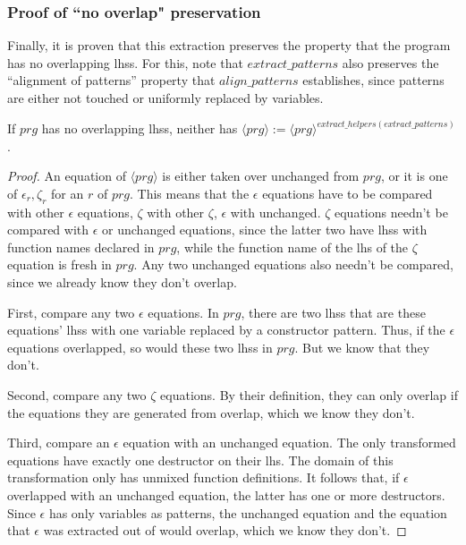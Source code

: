 \subsubsection{Proof of ``no overlap" preservation}

Finally, it is proven that this extraction preserves the property that the program has no overlapping lhss. For this, note that $extract\_patterns$ also preserves the ``alignment of patterns'' property that $align\_patterns$ establishes, since patterns are either not touched or uniformly replaced by variables.

\begin{lemma}

If $prg$ has no overlapping lhss, neither has $\langle prg \rangle := \langle prg \rangle^{extract\_helpers(extract\_patterns)}$.

\begin{proof}

An equation of $\langle prg \rangle$ is either taken over unchanged from $prg$, or it is one of $\epsilon_r, \zeta_r$ for an $r$ of $prg$. This means that the $\epsilon$ equations have to be compared with other $\epsilon$ equations, $\zeta$ with other $\zeta$, $\epsilon$ with unchanged. $\zeta$ equations needn't be compared with $\epsilon$ or unchanged equations, since the latter two have lhss with function names declared in $prg$, while the function name of the lhs of the $\zeta$ equation is fresh in $prg$. Any two unchanged equations also needn't be compared, since we already know they don't overlap.

First, compare any two $\epsilon$ equations. In $prg$, there are two lhss that are these equations' lhss with one variable replaced by a constructor pattern. Thus, if the $\epsilon$ equations overlapped, so would these two lhss in $prg$. But we know that they don't.

Second, compare any two $\zeta$ equations. By their definition, they can only overlap if the equations they are generated from overlap, which we know they don't.

Third, compare an $\epsilon$ equation with an unchanged equation. The only transformed equations have exactly one destructor on their lhs. The domain of this transformation only has unmixed function definitions. It follows that, if $\epsilon$ overlapped with an unchanged equation, the latter has one or more destructors. Since $\epsilon$ has only variables as patterns, the unchanged equation and the equation that $\epsilon$ was extracted out of would overlap, which we know they don't.

\end{proof}

\end{lemma}

